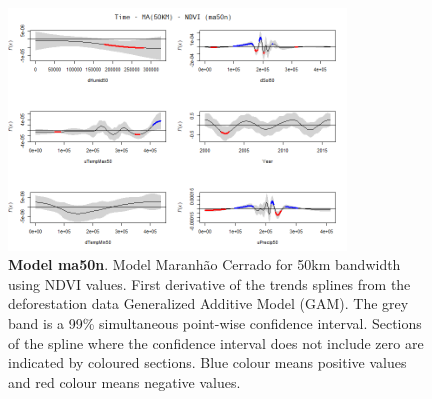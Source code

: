 \begin{table}
\begin{figure}[H]
 \centering
        \centering
        \includegraphics[width=0.8\textwidth]{ma50n.png} %
        \caption[Model Cerrado Maranhão for 50km bandwidth using NDVI values. First derivative of the trends splines from the deforestation data Generalized Additive Model (GAM)]{\textbf{Model ma50n}. Model Maranhão Cerrado for 50km bandwidth using NDVI values. First derivative of the trends splines from the deforestation data Generalized Additive Model (GAM). The grey band is a 99\% simultaneous point-wise confidence interval. Sections of the spline where the confidence interval does not include zero are indicated by coloured sections. Blue colour means positive values and red colour means negative values.}
\end{figure}

\end{table}

